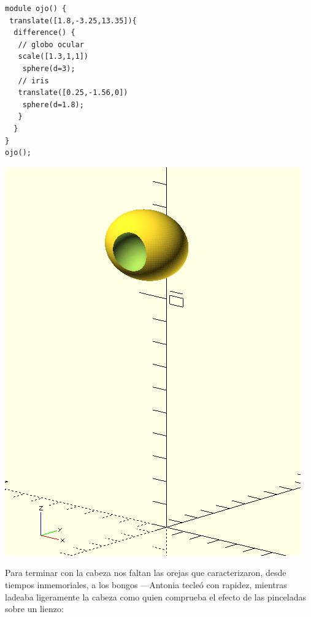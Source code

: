         \begin{center}
  \begin{minipage}[]{.64\textwidth}
    \begin{lstlisting}
module ojo() {
 translate([1.8,-3.25,13.35]){
  difference() {    
   // globo ocular
   scale([1.3,1,1]) 
    sphere(d=3);
   // iris 
   translate([0.25,-1.56,0]) 
    sphere(d=1.8);
   }
  }
}
ojo();
\end{lstlisting}
  \end{minipage}\hfill
  \begin{minipage}[]{.35\textwidth}
      \centering
      \includegraphics[width=\textwidth]{imagenes/ojo}
    \end{minipage}
  \end{center}

  \guillemotright Para terminar con la cabeza nos faltan las orejas
  que caracterizaron, desde tiempos inmemoriales, a los bongos
  ---Antonia tecleó con rapidez, mientras ladeaba ligeramente la
  cabeza como quien comprueba el efecto de las pinceladas sobre un
  lienzo:

